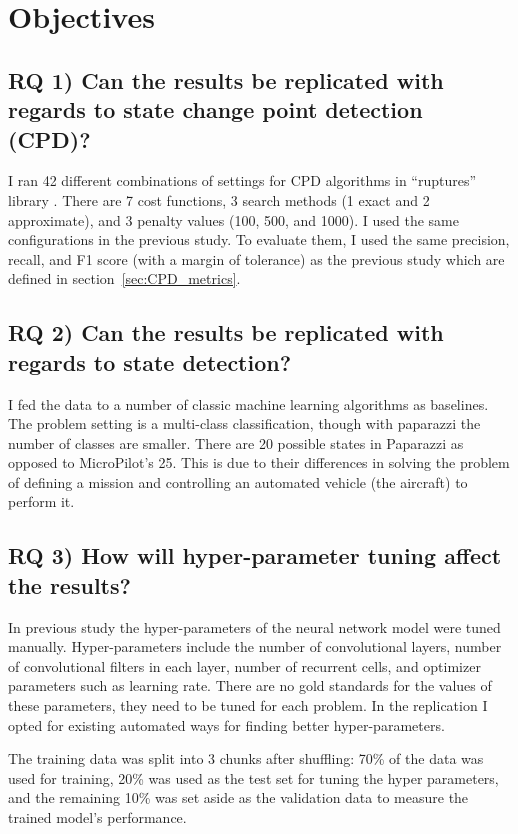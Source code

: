 \section{Objectives}
\subsection{RQ 1) Can the results be replicated with regards to state change point detection (CPD)?}
I ran 42 different combinations of settings for CPD algorithms in ``ruptures'' library \cite{Truong2018ChangePointSurvey}. 
There are 7 cost functions, 3 search methods (1 exact and 2 approximate), and 3 penalty values (100, 500, and 1000).
I used the same configurations in the previous study. 
To evaluate them, I used the same precision, recall, and F1 score (with a margin of tolerance) as the previous study which are defined in section~\ref{sec:CPD_metrics}.

\subsection{RQ 2) Can the results be replicated with regards to state detection?}
I fed the data to a number of classic machine learning algorithms as baselines. The problem setting is a multi-class classification, though with paparazzi the number of classes are smaller. 
There are 20 possible states in Paparazzi as opposed to MicroPilot's 25. This is due to their differences in solving the problem of defining a mission and controlling an automated vehicle (the aircraft) to perform it.

\subsection{RQ 3) How will hyper-parameter tuning affect the results?}
In previous study the hyper-parameters of the neural network model were tuned manually. Hyper-parameters include the number of convolutional layers, number of convolutional filters in each layer, number of recurrent cells, and optimizer parameters such as learning rate. There are no gold standards for the values of these parameters, they need to be tuned for each problem. In the replication I opted for existing automated ways for finding better hyper-parameters.

The training data was split into 3 chunks after shuffling: 70\% of the data was used for training, 20\% was used as the test set for tuning the hyper parameters, and the remaining 10\% was set aside as the validation data to measure the trained model's performance. 


